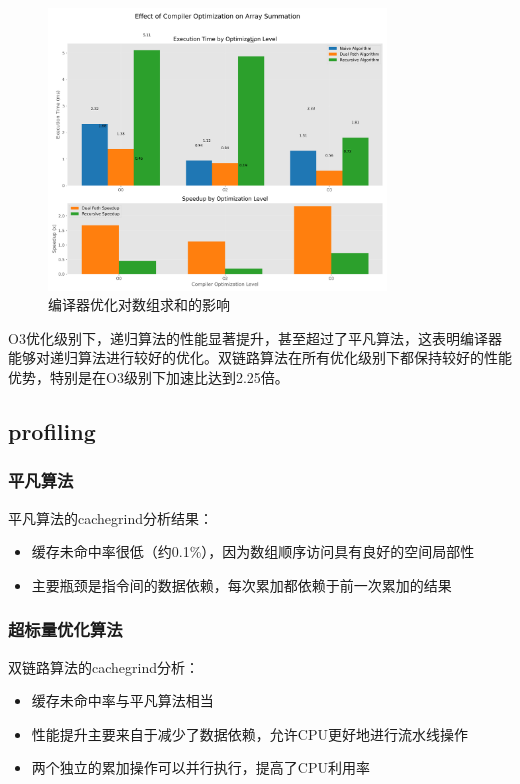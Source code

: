 \documentclass[a4paper,colorlinks=true,linkcolor=blue,urlcolor=blue,citecolor=green,bookmarks=true]{article}
\begin{document}
\begin{figure}[htbp]
  \centering
  \includegraphics[width=0.8\textwidth]{compiler_opt_sum.png}
  \caption{编译器优化对数组求和的影响}
  \label{fig:compiler_opt_sum}
\end{figure}

O3优化级别下，递归算法的性能显著提升，甚至超过了平凡算法，这表明编译器能够对递归算法进行较好的优化。双链路算法在所有优化级别下都保持较好的性能优势，特别是在O3级别下加速比达到2.25倍。

\subsection{profiling}

\subsubsection{平凡算法}

平凡算法的cachegrind分析结果：

\begin{itemize}
  \item 缓存未命中率很低（约0.1\%），因为数组顺序访问具有良好的空间局部性
  \item 主要瓶颈是指令间的数据依赖，每次累加都依赖于前一次累加的结果
\end{itemize}

\subsubsection{超标量优化算法}

双链路算法的cachegrind分析：

\begin{itemize}
  \item 缓存未命中率与平凡算法相当
  \item 性能提升主要来自于减少了数据依赖，允许CPU更好地进行流水线操作
  \item 两个独立的累加操作可以并行执行，提高了CPU利用率
\end{itemize}
\end{document}
